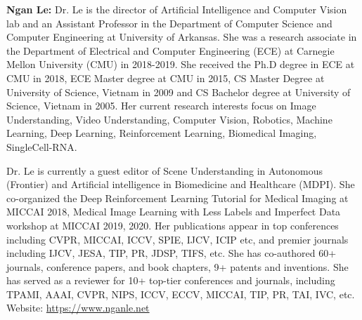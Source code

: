 \documentclass{ieeeaccess}
\begin{document}
\begin{IEEEbiography}{} \textbf{Ngan Le:} Dr. Le is the director of Artificial Intelligence and Computer Vision lab and an Assistant Professor in the Department of Computer Science and Computer Engineering at University of Arkansas. She was a research associate in the Department of Electrical and Computer Engineering (ECE) at Carnegie Mellon University (CMU) in 2018-2019. She received the Ph.D degree in ECE at CMU in 2018, ECE Master degree at CMU in 2015, CS Master Degree at University of Science, Vietnam in 2009 and CS Bachelor degree at University of Science, Vietnam in 2005. Her current research interests focus on Image Understanding, Video Understanding, Computer Vision, Robotics, Machine Learning, Deep Learning, Reinforcement Learning, Biomedical Imaging, SingleCell-RNA.

Dr. Le is currently a guest editor of Scene Understanding in Autonomous (Frontier) and Artificial intelligence in Biomedicine and Healthcare (MDPI). She co-organized the Deep Reinforcement Learning Tutorial for Medical Imaging at MICCAI 2018, Medical Image Learning with Less Labels and Imperfect Data workshop at MICCAI 2019, 2020. Her publications appear in top conferences including CVPR, MICCAI, ICCV, SPIE, IJCV, ICIP etc, and premier journals including IJCV, JESA, TIP, PR, JDSP, TIFS, etc. She has co-authored 60+ journals, conference papers, and book chapters, 9+ patents and inventions. She has served as a reviewer for 10+ top-tier conferences and journals, including TPAMI, AAAI, CVPR, NIPS, ICCV, ECCV, MICCAI, TIP, PR, TAI, IVC, etc.
Website: \url{https://www.nganle.net}
\end{IEEEbiography}

\EOD
\end{document}
